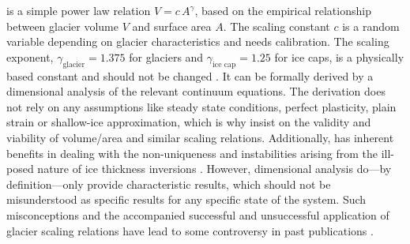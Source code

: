     \Vas{} is a simple power law relation $ V = c\,A^\gamma$, based on the empirical relationship between glacier volume $V$ and surface area $A$. The scaling constant $c$ is a random variable depending on glacier characteristics and needs calibration. The scaling exponent, $\gamma_\text{glacier} = 1.375$ for glaciers and $\gamma_\text{ice cap} = 1.25$ for ice caps, is a physically based constant and should not be changed \citep{Bahr1997b}. It can be formally derived by a dimensional analysis of the relevant continuum equations. The derivation does not rely on any assumptions like steady state conditions, perfect plasticity, plain strain or shallow-ice approximation, which is why \citet{Bahr2015} insist on the validity and viability of volume/area and similar scaling relations. Additionally, \vas{} has inherent benefits in dealing with the non-uniqueness and instabilities arising from the ill-posed nature of ice thickness inversions \citep{Bahr2014}. However, dimensional analysis do---by definition---only provide characteristic results, which should not be misunderstood as specific results for any specific state of the system. Such misconceptions and the accompanied successful and unsuccessful application of glacier scaling relations have lead to some controversy in past publications \citep[][see Table 1 for an overview]{Bahr2015}.

